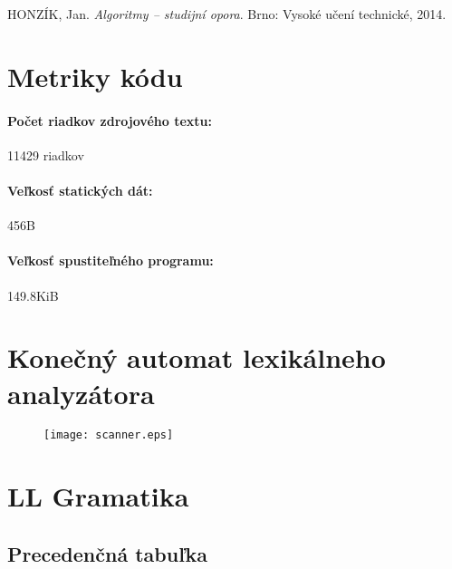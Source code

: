 \documentclass[12pt,a4paper,titlepage,final]{article}
\begin{document}
\begin{thebibliography}{1}

HONZÍK, Jan. \emph{Algoritmy -- studijní opora}. 
Brno: Vysoké učení technické, 2014.

\end{thebibliography}

\appendix

\section{Metriky kódu} \label{metriky}
\paragraph{Počet riadkov zdrojového textu:} 11429 riadkov
\paragraph{Veľkosť statických dát:} 456B
\paragraph{Veľkosť spustiteľného programu:} 149.8KiB

\section{Konečný automat lexikálneho analyzátora}\label{chap:scanner}

\begin{figure}[H]
\begin{center}
	\texttt{[image: scanner.eps]}
	\label{fig:scanner}
\end{center}
\end{figure}

%
\section{LL Gramatika} \label{gramatika}



%
\clearpage
\begin{landscape}
	\section{Precedenčná tabuľka} \label{precedencna_tabulka}
	
\end{landscape}
\clearpage
\newpage
\end{document}
